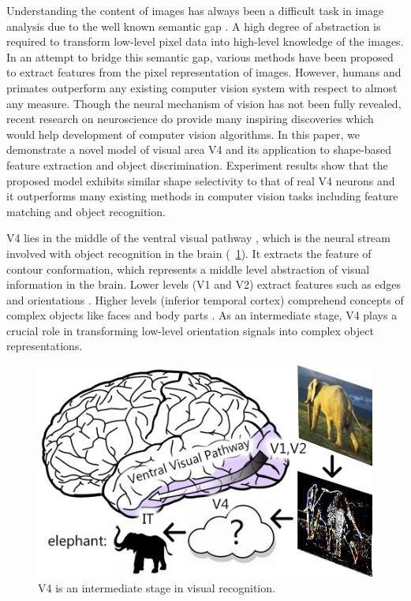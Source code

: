 \documentclass[twocolumn]{article}
\begin{document}
Understanding the content of images has always been a difficult task in image analysis due to the well known semantic gap \cite{smeulders2000}.
A high degree of abstraction is required to transform low-level pixel data into high-level knowledge of the images.
In an attempt to bridge this semantic gap, various methods have been proposed to extract features from the pixel representation of images.
However, humans and primates outperform any existing computer vision system with respect to almost any measure.
Though the neural mechanism of vision has not been fully revealed,
recent research on neuroscience do provide many inspiring discoveries which would help development of computer vision algorithms.
In this paper, we demonstrate a novel model of visual area V4 and its application to shape-based feature extraction and object discrimination.
Experiment results show that the proposed model exhibits similar shape selectivity to that of real V4 neurons
and it outperforms many existing methods in computer vision tasks including feature matching and object recognition. 

V4 lies in the middle of the ventral visual pathway \cite{ettlinger1990}, 
which is the neural stream involved with object recognition in the brain (\figurename~\ref{fig:1}).
It extracts the feature of contour conformation, which represents a middle level abstraction of visual information in the brain.
Lower levels (V1 and V2) extract features such as edges and orientations \cite{hubel1962}.
Higher levels (inferior temporal cortex) comprehend concepts of complex objects like faces and body parts \cite{bell2009}.
As an intermediate stage, V4 plays a crucial role in transforming low-level orientation signals into complex object representations.

\begin{figure}[!t]
\centerline{\includegraphics[width=0.8\linewidth]{images/fig1.jpg}} 
\caption{V4 is an intermediate stage in visual recognition.}
\label{fig:1}
\end{figure}
\end{document}
